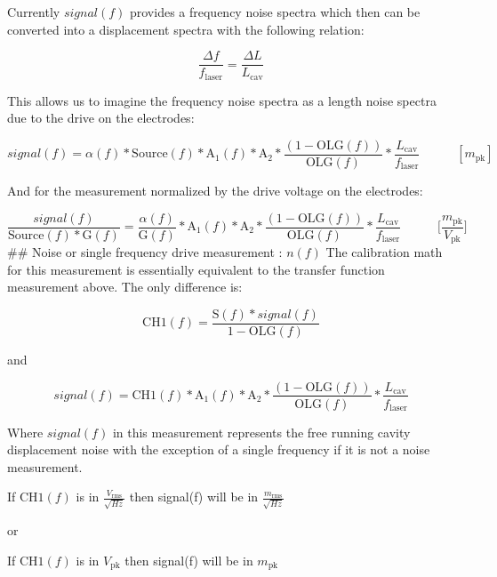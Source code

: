 Currently \(signal(f)\) provides a frequency noise spectra which then
can be converted into a displacement spectra with the following
relation:

\[\frac{\Delta f}{f_\mathrm{laser}} = \frac{\Delta L}{L_\mathrm{cav}}\]

This allows us to imagine the frequency noise spectra as a length noise
spectra due to the drive on the electrodes:

\[signal(f) = \alpha(f)* \mathrm{Source}(f) * \mathrm{A}_{1}(f) * \mathrm{A}_2* \frac{(1-\mathrm{OLG}(f))}{\mathrm{OLG}(f)} * \frac{L_\mathrm{cav}}{f_\mathrm{laser}}\hspace{35pt} [m_\mathrm{pk}]\]

And for the measurement normalized by the drive voltage on the
electrodes:

\[\frac{signal(f)}{\mathrm{Source}(f) * \mathrm{G}(f)} = \frac{\alpha(f)}{\mathrm{G}(f)} * \mathrm{A}_{1}(f) * \mathrm{A}_2* \frac{(1-\mathrm{OLG}(f))}{\mathrm{OLG}(f)} * \frac{L_\mathrm{cav}}{f_\mathrm{laser}}\hspace{35pt} \bigg[\frac{m_\mathrm{pk}}{V_\mathrm{pk}}\bigg]\]
\#\# Noise or single frequency drive measurement : \(n(f)\) The
calibration math for this measurement is essentially equivalent to the
transfer function measurement above. The only difference is:

\[\mathrm{CH1}(f) = \frac{\mathrm{S}(f)* signal(f)}{1-\mathrm{OLG}(f)}\]

and

\[signal(f) = \mathrm{CH1}(f) * \mathrm{A}_{1}(f) * \mathrm{A}_2* \frac{(1-\mathrm{OLG}(f))}{\mathrm{OLG}(f)} * \frac{L_\mathrm{cav}}{f_\mathrm{laser}}\]

Where \(signal(f)\) in this measurement represents the free running
cavity displacement noise with the exception of a single frequency if it
is not a noise measurement.

If \(\mathrm{CH1}(f)\) is in \(\frac{V_\mathrm{rms}}{\sqrt{Hz}}\) then
signal(f) will be in \(\frac{m_\mathrm{rms}}{\sqrt{Hz}}\)

or

If \(\mathrm{CH1}(f)\) is in \(V_\mathrm{pk}\) then signal(f) will be in
\(m_\mathrm{pk}\) 
\fi



